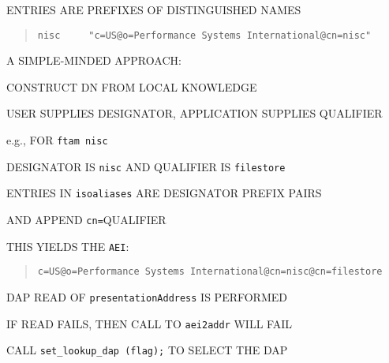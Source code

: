 \begin{bwslide}

\begin{nrtc}
\item	ENTRIES ARE PREFIXES OF DISTINGUISHED NAMES
\begin{quote}\small\begin{verbatim}
nisc     "c=US@o=Performance Systems International@cn=nisc"
\end{verbatim}\end{quote}

\item	A SIMPLE-MINDED APPROACH:
    \begin{nrtc}
    \item	CONSTRUCT DN FROM LOCAL KNOWLEDGE
    \end{nrtc}

\item	USER SUPPLIES DESIGNATOR, APPLICATION SUPPLIES QUALIFIER
    \begin{nrtc}
    \item	e.g., FOR \verb"ftam nisc" 
    \end{nrtc}
    DESIGNATOR IS \verb"nisc" AND QUALIFIER IS \verb"filestore"

\item	ENTRIES IN \verb"isoaliases" ARE DESIGNATOR PREFIX PAIRS

\item	AND APPEND \verb"cn="QUALIFIER

\item	THIS YIELDS THE \verb"AEI":
\begin{quote}\small\begin{verbatim}
c=US@o=Performance Systems International@cn=nisc@cn=filestore
\end{verbatim}\end{quote}
\end{nrtc}
\end{bwslide}


\begin{bwslide}

\begin{nrtc}
\item	DAP READ OF \verb"presentationAddress" IS PERFORMED

\item	IF READ FAILS, THEN CALL TO \verb"aei2addr" WILL FAIL

\item	CALL \verb"set_lookup_dap (flag);" TO SELECT THE DAP
\end{nrtc}
\end{bwslide}


